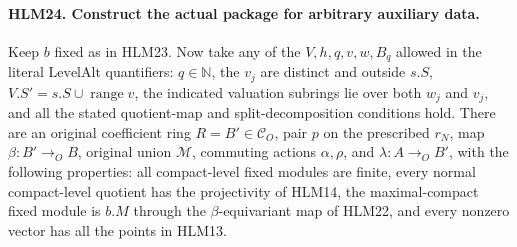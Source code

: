 \paragraph{HLM24. Construct the actual package for arbitrary auxiliary data.}
\label{claim:HLM24}
Keep \(b\) fixed as in HLM23.  Now take any of the
\(V,h,q,v,w,B_q\) allowed in the literal
\(\mathrm{LevelAlt}\) quantifiers: \(q\in\mathbb N\),
the \(v_j\) are distinct and outside \(s.S\),
\(V.S'=s.S\cup\operatorname{range}v\), the indicated
valuation subrings lie over both \(w_j\) and \(v_j\),
and all the stated quotient-map and split-decomposition
conditions hold.  There are an original coefficient ring
\(R=B'\in\mathcal C_O\), pair \(p\) on the prescribed
\(r_N\), map \(\beta:B'\to_OB\), original union
\(\mathcal M\), commuting actions \(\alpha,\rho\),
and \(\lambda:A\to_OB'\), with the following properties:
all compact-level fixed modules are finite, every normal
compact-level quotient has the projectivity of HLM14,
the maximal-compact fixed module is \(b.M\) through the
\(\beta\)-equivariant map of HLM22, and every nonzero
vector has all the points in HLM13.
